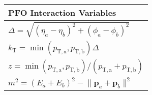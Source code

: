 \begin{table}[!htb]
    \centering
    \caption{}
    \label{tab:pfo_interaction_variables}
    \begin{tabular}{l}
    \toprule
        PFO Interaction Variables \\
    \midrule
        $\Delta = \sqrt{(\eta_a - \eta_b)^2 + (\phi_a - \phi_b)^2}$ \\
        $k_\mathrm{T} = \min{(p_\mathrm{T, a}, p_\mathrm{T, b})} \Delta$ \\
        $z = \min{(p_\mathrm{T, a}, p_\mathrm{T, b})} / (p_\mathrm{T, a} + p_\mathrm{T, b})$ \\
        $m^2 = (E_a + E_b)^2 -  \lVert \textbf{p}_a + \textbf{p}_b \rVert^2$ \\
    \bottomrule
    \end{tabular}
\end{table}
    